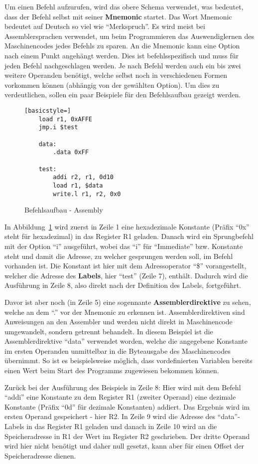 Um einen Befehl aufzurufen, wird das obere Schema verwendet, was bedeutet, dass
der Befehl selbst mit seiner \textbf{Mnemonic} startet. Das Wort Mnemonic
bedeutet auf Deutsch so viel wie "`Merkspruch"'. Es wird meist bei
Assemblersprachen verwendet, um beim Programmieren das Auswendiglernen des
Maschinencodes jedes Befehls zu sparen. An die Mnemonic kann eine Option nach
einem Punkt angehängt werden. Dies ist befehlsspezifisch und muss für jeden
Befehl nachgeschlagen werden. Je nach Befehl werden auch ein bis zwei weitere
Operanden benötigt, welche selbst noch in verschiedenen Formen vorkommen können
(abhängig von der gewählten Option). Um dies zu verdeutlichen, sollen ein
paar Beispiele für den Befehlsaufbau gezeigt werden.
\begin{figure}
	\begin{lstlisting}[basicstyle=]
	load r1, 0xAFFE
	jmp.i $test

	data:
		.data 0xFF

	test:
		addi r2, r1, 0d10
		load r1, $data
		write.l r1, r2, 0x0
\end{lstlisting}
\caption{Befehlsaufbau - Assembly}
\label{code:instruction_code}
\end{figure}

In Abbildung~\ref{code:instruction_code} wird zuerst in Zeile 1 eine
hexadezimale Konstante (Präfix "`0x"' steht für hexadezimal) in das Register R1
geladen. Danach wird ein Sprungbefehl mit der Option "`i"' ausgeführt, wobei das
"`i"' für "`Immediate"' bzw. Konstante steht und damit die Adresse, zu welcher
gesprungen werden soll, im Befehl vorhanden ist.  Die Konstant ist hier mit dem
Adressoperator "`\$"' vorangestellt, welcher die Adresse des \textbf{Labels}, hier
"`test"' (Zeile 7), enthält. Dadurch wird die Ausführung in Zeile 8, also direkt
nach der Definition des Labels, fortgeführt.

Davor ist aber noch (in Zeile 5) eine sogennante \textbf{Assemblerdirektive}
zu sehen, welche an dem "`."' vor der Mnemonic zu erkennen ist.
Assemblerdirektiven sind Anweisungen an den Assembler und werden nicht direkt in
Maschinencode umgewandelt, sondern getrennt behandelt. In diesem Beispiel ist
die Assemblerdirektive "`data"' verwendet worden, welche die angegebene Konstante
im ersten Operanden unmittelbar in die Byteausgabe des Maschinencodes übernimmt.
So ist es beispielsweise möglich, dass vordefinierten Variablen bereits einen
Wert beim Start des Programms zugewiesen bekommen können.

Zurück bei der Ausführung des Beispiels in Zeile 8: Hier wird mit dem Befehl
"`addi"' eine Konstante zu dem Register R1 (zweiter Operand) eine dezimale
Konstante (Präfix "`0d"' für dezimale Konstanten) addiert. Das Ergebnis wird im
ersten Operand gespeichert - hier R2. In Zeile 9 wird die Adresse des
"`data"'-Labels in das Register R1 geladen und danach in Zeile 10 wird an die
Speicheradresse in R1 der Wert im Register R2 geschrieben. Der dritte Operand
wird hier nicht benötigt und daher null gesetzt, kann aber für einen Offset der
Speicheradresse dienen.
\pagebreak
